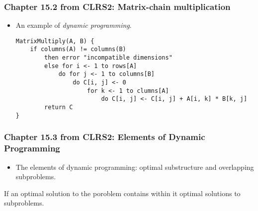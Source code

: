 \documentclass[a4paper,11pt]{article}
\begin{document}
\subsubsection{Chapter 15.2 from CLRS2: Matrix-chain
multiplication}\label{chapter-15.2-from-clrs2-matrix-chain-multiplication}

\begin{itemize}
\item
  An example of \emph{dynamic programming}.

\begin{verbatim}
MatrixMultiply(A, B) {
    if columns(A) != columns(B)
        then error "incompatible dimensions"
        else for i <- 1 to rows[A]
            do for j <- 1 to columns[B] 
                do C[i, j] <- 0
                    for k <- 1 to clumns[A]
                        do C[i, j] <- C[i, j] + A[i, k] * B[k, j]
        return C
}
\end{verbatim}
\end{itemize}

\subsubsection{Chapter 15.3 from CLRS2: Elements of Dynamic
Programming}\label{chapter-15.3-from-clrs2-elements-of-dynamic-programming}

\begin{itemize}
\itemsep1pt\parskip0pt
\item
  The elements of dynamic programming: optimal substructure and
  overlapping subproblems.
\end{itemize}

\begin{description}
\itemsep1pt\parskip0pt
\item[Optimal substructure]
If an optimal solution to the poroblem contains within it optimal
solutions to subproblems.
\end{description}
\end{document}
